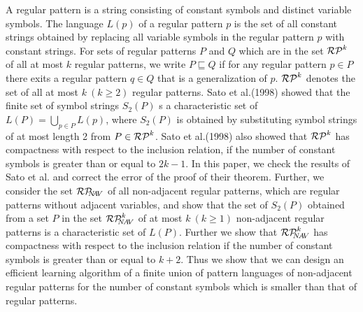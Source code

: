 \begin{summary}
A regular pattern is a string consisting of constant symbols and distinct variable symbols.
The language $L(p)$ of a regular pattern $p$ is the set of all constant strings obtained by replacing all variable symbols in the regular pattern $p$ with constant strings.
For sets of regular patterns $P$ and $Q$ which are in the set $\mathcal{RP}^{k}$ of all at most $k$ regular patterns, we write  $P \sqsubseteq Q$ if for any regular pattern $p \in P$ there exits a regular pattern  $q \in Q$ that is a generalization of $p$.
$\mathcal{RP}^{k}$ denotes the set of all at most $k~(k\geq 2)$ regular patterns.
Sato et al.(1998) showed that the finite set of symbol strings $S_2(P)$  s a characteristic set of $L(P)=\bigcup_{p\in P}L(p)$, where $S_2(P)$ is obtained by substituting symbol strings of at most length 2 from $P\in \mathcal{RP}^{k}$.
Sato et al.(1998) also showed that $\mathcal{RP}^{k}$  has compactness with respect to the inclusion relation, if the number of constant symbols is greater than or equal to $2k-1$.
In this paper, we check the results of Sato et al.\cite{Sato1} and correct the error of the proof of their theorem.
Further, we consider the set $\mathcal{RP}_{\!\!\!N\!\!A\!V}$ of all non-adjacent regular patterns, which are regular patterns without adjacent variables, and show that the set of $S_2(P)$ obtained from a set $P$ in the set $\mathcal{RP}^{k}_{\!\!\!N\!A\!V}$ of at most $k~(k\ge 1)$ non-adjacent regular patterns is a characteristic set of $L(P)$.
Further we show that $\mathcal{RP}^{k}_{\!\!\!N\!A\!V}$  has compactness with respect to the inclusion relation if the number of constant symbols is greater than or equal to $k+2$.
Thus we show that we can design an efficient learning algorithm of a finite union of pattern languages of non-adjacent regular patterns for the number of constant symbols which is smaller than that of regular patterns.
\end{summary}
